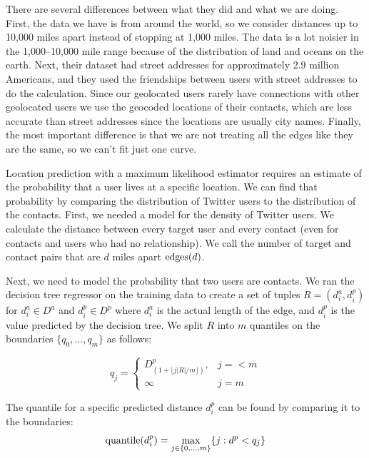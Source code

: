 There are several differences between what they did and what we are doing.
%
First, the data we have is from around the world, so we consider distances up
to 10,000 miles apart instead of stopping at 1,000 miles.
%
The data is a lot noisier in the 1,000--10,000 mile range because of the
distribution of land and oceans on the earth.
%
Next, their dataset had street addresses for approximately 2.9 million
Americans, and they used the friendships between users with street addresses to
do the calculation.
%
Since our geolocated users rarely have connections with other geolocated users
we use the geocoded locations of their contacts, which are less accurate than
street addresses since the locations are usually city names.
%
Finally, the most important difference is that we are not treating all the
edges like they are the same, so we can't fit just one curve.

Location prediction with a maximum likelihood estimator requires an estimate of
the probability that a user lives at a specific location.
%
We can find that probability by comparing the distribution of Twitter users to
the distribution of the contacts.
%
First, we needed a model for the density of Twitter users.
%
We calculate the distance between every target user and every contact
(even for contacts and users who had no relationship).
%
We call the number of target and contact pairs that are $d$ miles apart
$\operatorname{edges}(d)$.


Next, we need to model the probability that two users are contacts.
%
We ran the decision tree regressor on the training data to create a set of
tuples $R = (d^a_i, d^p_i)$ for $d^a_i \in D^a$ and $d^p_i \in D^p$ where
$d^a_i$ is the actual length of the edge, and $d^p_i$ is the value predicted by
the decision tree.
%
We split $R$ into $m$ quantiles on the boundaries $\{q_0,\dots,q_m\}$ as
follows:

\[
    q_j =
    \begin{cases}
        D^p_{(1+\lfloor j|R|/m \rfloor)}, & j=<m \\
        \infty & j=m
    \end{cases}
\]


The quantile for a specific predicted distance $d^p_i$ can be found by
comparing it to the boundaries:
\[
    \operatorname{quantile}(d^p_i) = \max_{j \in \{0,\dots,m\}} \{j: d^p<q_j\}
\]

